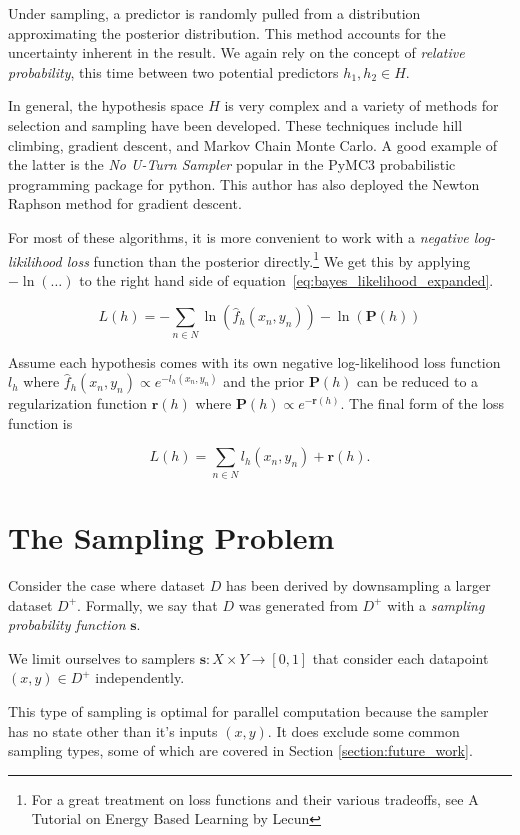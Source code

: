 \documentclass[twoside]{article}
\begin{document}
Under sampling, a predictor is randomly pulled from a distribution approximating the posterior distribution. This method accounts for the uncertainty inherent in the result. We again rely on the concept of \textit{relative probability}, this time between two potential predictors \(h_1, h_2 \in H\).

In general, the hypothesis space \(H\) is very complex and a variety of methods for selection and sampling have been developed. These techniques include hill climbing, gradient descent, and Markov Chain Monte Carlo. A good example of the latter is the \textit{No U-Turn Sampler}\cite{gelman} popular in the PyMC3\cite{pymc3} probabilistic programming package for python. This author has also deployed the Newton Raphson method for gradient descent.\cite{sklar_dirichlet}

For most of these algorithms, it is more convenient to work with a \textit{negative log-likilihood loss} function than the posterior directly.\footnote{For a great treatment on loss functions and their various tradeoffs, see A Tutorial on Energy Based Learning by Lecun\cite{lecun}} We get this by applying \(-\ln(\ldots)\) to the right hand side of equation~\ref{eq:bayes_likelihood_expanded}.

\[L(h)=-\sum_{n \in N} \ln(\hat{f}_h(x_n,y_n))-\ln(\mathbf{P}(h))\]

Assume each hypothesis comes with its own negative log-likelihood loss function \(l_h\) where \(\hat{f}_h(x_n,y_n)\propto e^{-l_h(x_n,y_n)}\) and the prior \(\mathbf{P}(h)\) can be reduced to a regularization function \(\mathbf{r}(h)\) where \(\mathbf{P}(h)\propto e^{-\mathbf{r}(h)}\). The final form of the loss function is

\[L(h)=\sum_{n \in N} l_h(x_n,y_n)+\mathbf{r}(h).\]

\section{The Sampling Problem}
\label{section:problem}

Consider the case where dataset \(D\) has been derived by downsampling a larger dataset \(D^+\). Formally, we say that \(D\) was generated from \(D^+\) with a \textit{sampling probability function} \(\mathbf{s}\).

We limit ourselves to samplers \(\mathbf{s}: X \times Y \rightarrow \left [ 0, 1\right ]\) that consider each datapoint \((x, y) \in D^+\) independently.

This type of sampling is optimal for parallel computation because the sampler has no state other than it's inputs \((x, y)\). It does exclude some common sampling types, some of which are covered in Section \ref{section:future_work}.
\end{document}
